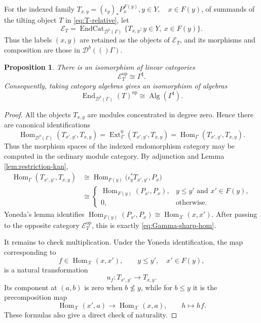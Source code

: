 \documentclass[12pt,a4paper,english,reqno]{amsart}
\theoremstyle{plain}
\newtheorem{proposition}[theorem]{Proposition}
\theoremstyle{definition}
\newcommand{\Hom}{\operatorname{Hom}}
\newcommand{\End}{\operatorname{End}}
\newcommand{\op}{\mathrm{op}}
\newcommand{\X}{\mathcal X}
\newcommand{\G}{\Gamma}
\newcommand{\Gs}{\Gamma^{\sharp}}
\newcommand{\Ext}{\operatorname{Ext}}
\newcommand{\Db}[1]{{\mathscr D}^b(#1)}
\begin{document}
For the indexed family $T_{x,y}=(\iota_y)_*P_x^{F(y)}, y\in Y,\quad x\in F(y)$,
of summands of the tilting object $T$ in \eqref{eq:T-relative}, let
\[
 \mathcal E_T
 =
 \operatorname{EndCat}_{\Db{\G}}
 \{T_{x,y}:y\in Y,\ x\in F(y)\}.
\]
Thus the labels $(x,y)$ are retained as the objects of $\mathcal E_T$, and
its morphisms and composition are those in $\Db(\G)$.

\begin{proposition}
\label{prop:end-relative}
There is an isomorphism of linear categories
\[
 \mathcal E_T^{\op}\cong\Gs.
\]
Consequently, taking category algebras gives an isomorphism of algebras
\[
 \End_{\Db{\G}}(T)^{\op}
 \cong\operatorname{Alg}(\Gs).
\]
\end{proposition}

\begin{proof}
All the objects $T_{x,y}$ are modules concentrated in degree zero.  Hence
there are canonical identifications
\[
 \Hom_{\Db{\G}}(T_{x',y'},T_{x,y})
 =\Ext^0_{\G}(T_{x',y'},T_{x,y})
 =\Hom_{\G}(T_{x',y'},T_{x,y}).
\]
Thus the morphism spaces of the indexed endomorphism category may be
computed in the ordinary module category.  By adjunction and Lemma
\ref{lem:restriction-kan},
\begin{align*}
 \Hom_{\G}(T_{x',y'},T_{x,y})
 &\cong
 \Hom_{F(y)}
 \bigl(\iota_y^*T_{x',y'},P_x\bigr)\\
 &\cong
 \begin{cases}
 \Hom_{F(y)}(P_{x'},P_x),
     &y\leq y'\text{ and }x'\in F(y),\\
 0,&\text{otherwise}.
 \end{cases}
\end{align*}
Yoneda's lemma identifies $\Hom_{F(y)}(P_{x'},P_x)\cong\Hom_{\X}(x,x')$.
After passing to the opposite category $\mathcal E_T^{\op}$, this is exactly
\eqref{eq:Gamma-sharp-hom}.

It remains to check multiplication.  Under the Yoneda identification, the
map corresponding to
\[
 f\in\Hom_{\X}(x,x'),\qquad
 y\leq y',\quad x'\in F(y),
\]
is a natural transformation
\begin{equation}
 u_f:T_{x',y'}\longrightarrow T_{x,y}.
\label{eq:uf}
\end{equation}
Its component at $(a,b)$ is zero when $b\nleq y$, while for $b\leq y$
it is the precomposition map
\begin{equation}
 \Hom_{\X}(x',a)\longrightarrow\Hom_{\X}(x,a),
 \qquad h\longmapsto hf.
\label{eq:uf-component}
\end{equation}
These formulas also give a direct check of naturality.


\end{proof}
\end{document}
